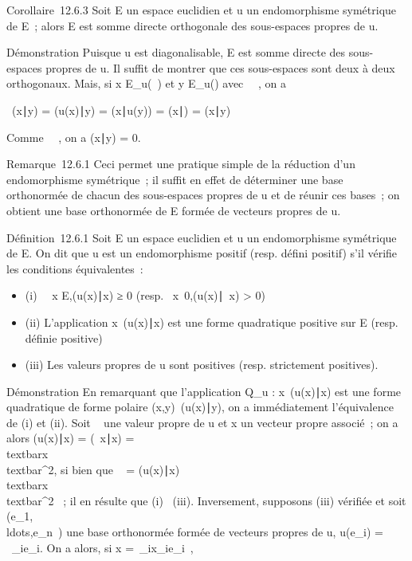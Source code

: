 \documentclass[]{article}
\begin{document}
Corollaire~12.6.3 Soit E un espace euclidien et u un endomorphisme
symétrique de E~; alors E est somme directe orthogonale des sous-espaces
propres de u.

Démonstration Puisque u est diagonalisable, E est somme directe des
sous-espaces propres de u. Il suffit de montrer que ces sous-espaces
sont deux à deux orthogonaux. Mais, si x \in E\_u(\lambda~) et y \in
E\_u(\mu) avec \lambda~\neq~\mu, on a

\lambda~(x∣y) = (u(x)\mathrel∣y)
= (x∣u(y)) =
(x∣\muy) = \mu(x\mathrel∣y)

Comme \lambda~\neq~\mu, on a
(x∣y) = 0.

Remarque~12.6.1 Ceci permet une pratique simple de la réduction d'un
endomorphisme symétrique~; il suffit en effet de déterminer une base
orthonormée de chacun des sous-espaces propres de u et de réunir ces
bases~; on obtient une base orthonormée de E formée de vecteurs propres
de u.

Définition~12.6.1 Soit E un espace euclidien et u un endomorphisme
symétrique de E. On dit que u est un endomorphisme positif (resp. défini
positif) s'il vérifie les conditions équivalentes~:

\begin{itemize}
\itemsep1pt\parskip0pt
\item
  (i) \forall~~x \in
  E,(u(x)∣x) ≥ 0 (resp.
  \forall~x\neq~0,(u(x)\mathrel∣~x)
  \textgreater{} 0)
\item
  (ii) L'application
  x\mapsto~(u(x)\mathrel∣x) est
  une forme quadratique positive sur E (resp. définie positive)
\item
  (iii) Les valeurs propres de u sont positives (resp. strictement
  positives).
\end{itemize}

Démonstration En remarquant que l'application Q\_u :
x\mapsto~(u(x)\mathrel∣x) est une
forme quadratique de forme polaire
(x,y)\mapsto~(u(x)\mathrel∣y), on
a immédiatement l'équivalence de (i) et (ii). Soit \lambda~ une valeur propre
de u et x un vecteur propre associé~; on a alors
(u(x)∣x) = (\lambda~x\mathrel∣x)
= \lambda~\\textbar{}x\\textbar{}^2,
si bien que \lambda~ = (u(x)∣x)
\over
\\textbar{}x\\textbar{}^2 ~;
il en résulte que (i) \rigtharrow~(iii). Inversement, supposons (iii) vérifiée et
soit
(e\_1,\\ldots,e\_n~)
une base orthonormée formée de vecteurs propres de u, u(e\_i) =
\lambda~\_ie\_i. On a alors, si x =\
\sum  \_ix\_ie\_i~,
\end{document}
